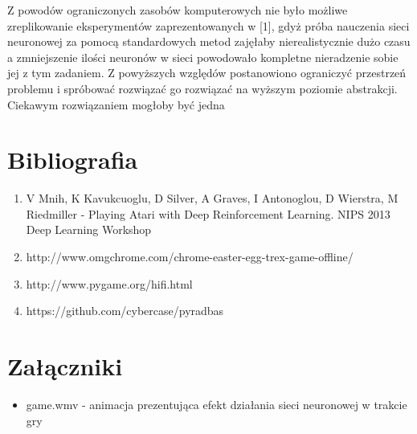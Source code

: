 \documentclass[11pt]{article} %
\begin{document}
Z powodów ograniczonych zasobów komputerowych nie było możliwe zreplikowanie eksperymentów zaprezentowanych w [1], gdyż próba nauczenia sieci neuronowej za pomocą standardowych metod zajęłaby nierealistycznie dużo czasu a zmniejszenie ilości neuronów w sieci powodowało kompletne nieradzenie sobie jej z tym zadaniem. Z powyższych względów postanowiono ograniczyć przestrzeń problemu i spróbować rozwiązać go rozwiązać na wyższym poziomie abstrakcji. Ciekawym rozwiązaniem mogłoby być jedna

\section*{Bibliografia}
\begin{enumerate}
\item V Mnih, K Kavukcuoglu, D Silver, A Graves, I Antonoglou, D Wierstra, M Riedmiller - Playing Atari with Deep Reinforcement Learning. NIPS 2013 Deep Learning Workshop

\item http://www.omgchrome.com/chrome-easter-egg-trex-game-offline/

\item http://www.pygame.org/hifi.html

\item https://github.com/cybercase/pyradbas

\end{enumerate}

\section*{Załączniki}

\begin{itemize}

\item game.wmv - animacja prezentująca efekt działania sieci neuronowej w trakcie gry

\end{itemize}
\end{document}
